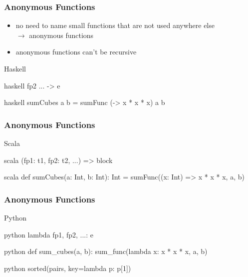 \documentclass[dvipsnames]{beamer}
\theoremstyle{plain}
\begin{document}
\begin{frame}[fragile]
  \frametitle{Anonymous Functions}

  \begin{itemize}
    \item no need to name small functions that are not used anywhere else\\
      $\rightarrow$ \alert{anonymous functions}
    \item anonymous functions can't be recursive
  \end{itemize}

  \pause
  \begin{block}{Haskell}
    \begin{pygments}{haskell}
       fp2 ... -> e
    \end{pygments}
  \end{block}

  \medskip
  \begin{example}
    \begin{pygments}{haskell}
sumCubes a b = sumFunc (\x -> x * x * x) a b
    \end{pygments}
  \end{example}
\end{frame}

\begin{frame}[fragile]
  \frametitle{Anonymous Functions}

  \begin{block}{Scala}
    \begin{pygments}{scala}
      (fp1: t1, fp2: t2, ...) => block
    \end{pygments}
  \end{block}

  \medskip
  \begin{example}
    \begin{pygments}{scala}
def sumCubes(a: Int, b: Int): Int =
    sumFunc((x: Int) => x * x * x, a, b)
    \end{pygments}
  \end{example}
\end{frame}

\begin{frame}[fragile]
  \frametitle{Anonymous Functions}

  \begin{block}{Python}
    \begin{pygments}{python}
      lambda fp1, fp2, ...: e
    \end{pygments}
  \end{block}

  \medskip
  \begin{example}
    \begin{pygments}{python}
def sum_cubes(a, b):
    sum_func(lambda x: x * x * x, a, b)
    \end{pygments}

    \pause
    \bigskip
    \begin{pygments}{python}
sorted(pairs, key=lambda p: p[1])
    \end{pygments}
  \end{example}
\end{frame}
\end{document}

